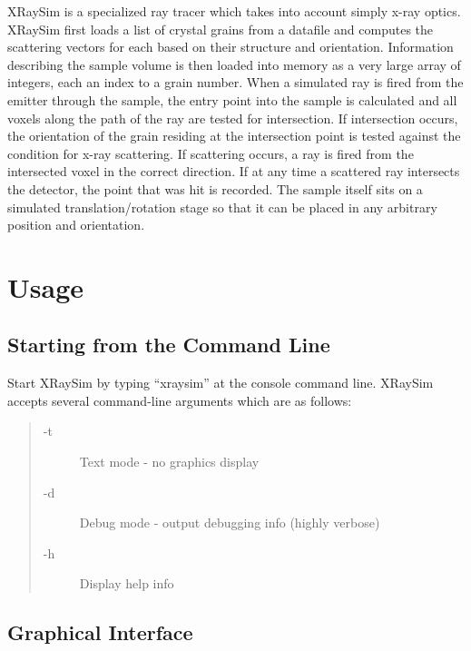 \documentclass{article}
\begin{document}
XRaySim is a specialized ray tracer which takes into account simply
x-ray optics.  XRaySim first loads a list of crystal grains from a
datafile and computes the scattering vectors for each based on their
structure and orientation. Information describing the sample volume is
then loaded into memory as a very large array of integers, each an
index to a grain number.  When a simulated ray is fired from the
emitter through the sample, the entry point into the sample is
calculated and all voxels along the path of the ray are tested for
intersection.  If intersection occurs, the orientation of the grain
residing at the intersection point is tested against the condition for
x-ray scattering.  If scattering occurs, a ray is fired from the
intersected voxel in the correct direction.  If at any time a
scattered ray intersects the detector, the point that was hit is
recorded. The sample itself sits on a simulated translation/rotation
stage so that it can be placed in any arbitrary position and
orientation.

\section{Usage}

\subsection{Starting from the Command Line}

Start XRaySim by typing ``xraysim'' at the console command line.
XRaySim accepts several command-line arguments which are as follows:

	\begin{quote}
		\begin{description}
		\item [-t] Text mode - no graphics display
		\item [-d] Debug mode - output debugging info (highly verbose)
		\item [-h] Display help info
		\end{description}
	\end{quote}

\subsection{Graphical Interface}
\end{document}
